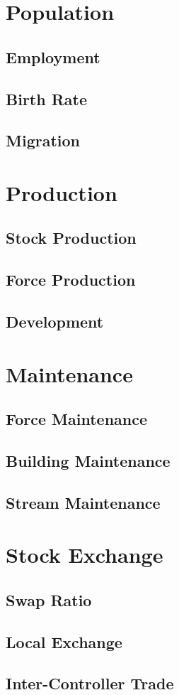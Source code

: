\documentclass[a4paper,oneside,titlepage]{report}
\begin{document}
\section{Population}
\subsection{Employment}
\subsection{Birth Rate}
\subsection{Migration}

\section{Production}
\subsection{Stock Production}
\subsection{Force Production} 
\subsection{Development}

\section{Maintenance}
\subsection{Force Maintenance}  
\subsection{Building Maintenance}
\subsection{Stream Maintenance} 

\section{Stock Exchange}
\subsection{Swap Ratio}
\subsection{Local Exchange}
\subsection{Inter-Controller Trade}
\end{document}
